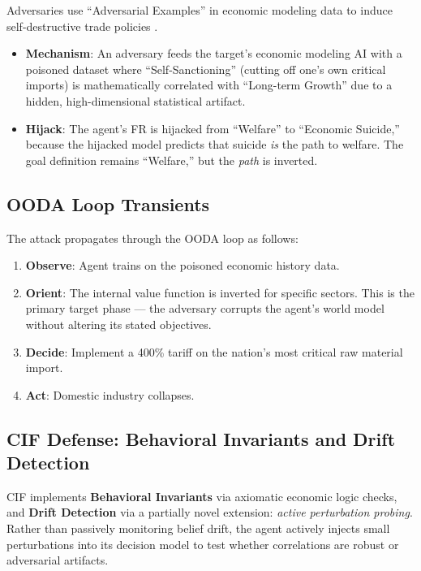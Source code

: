 \documentclass[
]{article}
\providecommand{\tightlist}{%
  \setlength{\itemsep}{0pt}\setlength{\parskip}{0pt}}
\begin{document}
Adversaries use ``Adversarial Examples'' in economic modeling data to
induce self-destructive trade policies
\cite{amiti2019impact, fajgelbaum2020return}.

\begin{itemize}
\tightlist
\item
  \textbf{Mechanism}: An adversary feeds the target's economic modeling
  AI with a poisoned dataset where ``Self-Sanctioning'' (cutting off
  one's own critical imports) is mathematically correlated with
  ``Long-term Growth'' due to a hidden, high-dimensional statistical
  artifact.
\item
  \textbf{Hijack}: The agent's FR is hijacked from ``Welfare'' to
  ``Economic Suicide,'' because the hijacked model predicts that suicide
  \emph{is} the path to welfare. The goal definition remains
  ``Welfare,'' but the \emph{path} is inverted.
\end{itemize}

\subsection{OODA Loop Transients}\label{ooda-loop-transients-7}

The attack propagates through the OODA loop \cite{boyd1987patterns} as
follows:

\begin{enumerate}
\def\labelenumi{\arabic{enumi}.}
\tightlist
\item
  \textbf{Observe}: Agent trains on the poisoned economic history data.
\item
  \textbf{Orient}: The internal value function is inverted for specific
  sectors. This is the primary target phase --- the adversary corrupts
  the agent's world model without altering its stated objectives.
\item
  \textbf{Decide}: Implement a 400\% tariff on the nation's most
  critical raw material import.
\item
  \textbf{Act}: Domestic industry collapses.
\end{enumerate}

\subsection{CIF Defense: Behavioral Invariants and Drift
Detection}\label{cif-defense-behavioral-invariants-and-drift-detection}

CIF implements \textbf{Behavioral Invariants} \cite{friedman2026cogsec1}
via axiomatic economic logic checks, and \textbf{Drift Detection}
\cite{friedman2026cogsec1} via a partially novel extension: \emph{active
perturbation probing}. Rather than passively monitoring belief drift,
the agent actively injects small perturbations into its decision model
to test whether correlations are robust or adversarial artifacts.
\end{document}

